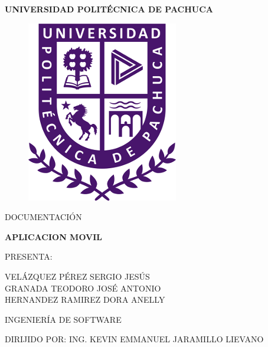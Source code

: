 \begin{center}
\begin{LARGE}
\begin{Large}

\textbf{UNIVERSIDAD POLIT\'ECNICA DE PACHUCA}
\end{Large}
\vspace{1cm}

\begin{figure}
\begin{center}
\includegraphics [scale=0.5]{imagenes/logo.png}
\end{center}
\end{figure}
\vspace{0.5cm}
\begin{large}
DOCUMENTACI\'ON \\
\end{large}
\vspace{1cm}
\begin{Large}
\textbf{APLICACION MOVIL} \\
\end{Large}
\vspace*{1.5cm}
\begin{large}
PRESENTA: \\
\end{large}
\vspace*{0.5cm}
\begin{large}
VEL\'AZQUEZ P\'EREZ SERGIO JES\'US \\
\vspace*{0.1 cm}
GRANADA TEODORO JOS\'E ANTONIO \\
\vspace*{0.1 cm}
HERNANDEZ RAMIREZ DORA ANELLY \\
\end{large}
\vspace*{1.5cm}
\begin{large}
INGENIER\'IA DE SOFTWARE \\
\end{large}
\vspace*{1.3 cm}
\begin{large}
DIRIJIDO POR:
\vspace{0.1 cm}
ING. KEVIN EMMANUEL JARAMILLO LIEVANO
\end{large}
\end{LARGE}
\end{center}